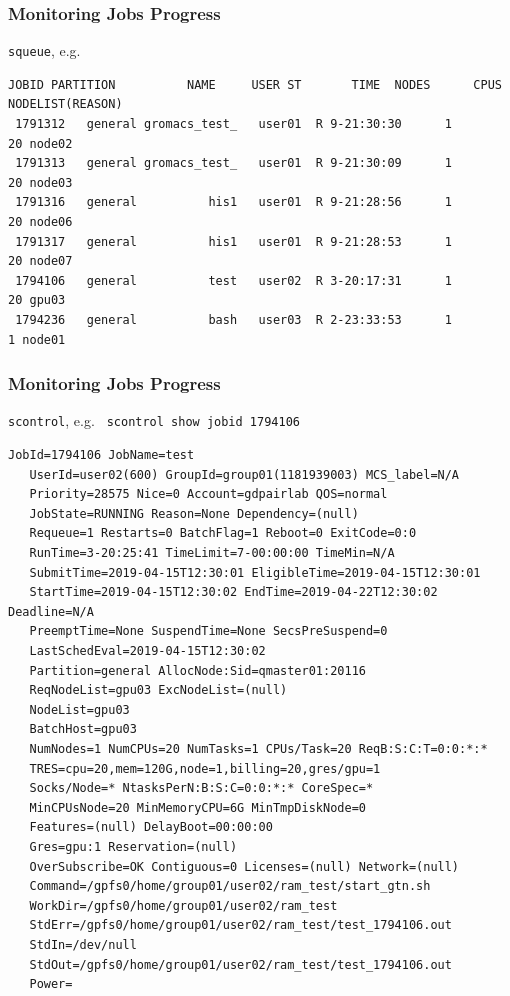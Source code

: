 \documentclass{beamer}
\newcommand{\code}[1]{\colorbox{codegray}{\texttt{#1}}}
\begin{document}
\begin{frame}[fragile]
\frametitle{Monitoring Jobs Progress}
\code{squeue}, e.g. 
\begingroup
\tiny
\begin{lstlisting}[backgroundcolor = \color{codegray},showstringspaces=false]
   JOBID PARTITION          NAME     USER ST       TIME  NODES      CPUS NODELIST(REASON)
 1791312   general gromacs_test_   user01  R 9-21:30:30      1        20 node02
 1791313   general gromacs_test_   user01  R 9-21:30:09      1        20 node03
 1791316   general          his1   user01  R 9-21:28:56      1        20 node06
 1791317   general          his1   user01  R 9-21:28:53      1        20 node07
 1794106   general          test   user02  R 3-20:17:31      1        20 gpu03
 1794236   general          bash   user03  R 2-23:33:53      1         1 node01
\end{lstlisting}
\endgroup
\end{frame}



\begin{frame}[fragile]
\frametitle{Monitoring Jobs Progress}
\code{scontrol}, e.g. \code{ scontrol show jobid 1794106}
\begingroup
\tiny
\begin{lstlisting}[backgroundcolor = \color{codegray},showstringspaces=false]
JobId=1794106 JobName=test
   UserId=user02(600) GroupId=group01(1181939003) MCS_label=N/A
   Priority=28575 Nice=0 Account=gdpairlab QOS=normal
   JobState=RUNNING Reason=None Dependency=(null)
   Requeue=1 Restarts=0 BatchFlag=1 Reboot=0 ExitCode=0:0
   RunTime=3-20:25:41 TimeLimit=7-00:00:00 TimeMin=N/A
   SubmitTime=2019-04-15T12:30:01 EligibleTime=2019-04-15T12:30:01
   StartTime=2019-04-15T12:30:02 EndTime=2019-04-22T12:30:02 Deadline=N/A
   PreemptTime=None SuspendTime=None SecsPreSuspend=0
   LastSchedEval=2019-04-15T12:30:02
   Partition=general AllocNode:Sid=qmaster01:20116
   ReqNodeList=gpu03 ExcNodeList=(null)
   NodeList=gpu03
   BatchHost=gpu03
   NumNodes=1 NumCPUs=20 NumTasks=1 CPUs/Task=20 ReqB:S:C:T=0:0:*:*
   TRES=cpu=20,mem=120G,node=1,billing=20,gres/gpu=1
   Socks/Node=* NtasksPerN:B:S:C=0:0:*:* CoreSpec=*
   MinCPUsNode=20 MinMemoryCPU=6G MinTmpDiskNode=0
   Features=(null) DelayBoot=00:00:00
   Gres=gpu:1 Reservation=(null)
   OverSubscribe=OK Contiguous=0 Licenses=(null) Network=(null)
   Command=/gpfs0/home/group01/user02/ram_test/start_gtn.sh
   WorkDir=/gpfs0/home/group01/user02/ram_test
   StdErr=/gpfs0/home/group01/user02/ram_test/test_1794106.out
   StdIn=/dev/null
   StdOut=/gpfs0/home/group01/user02/ram_test/test_1794106.out
   Power=
\end{lstlisting}
\endgroup
\end{frame}
\end{document}
